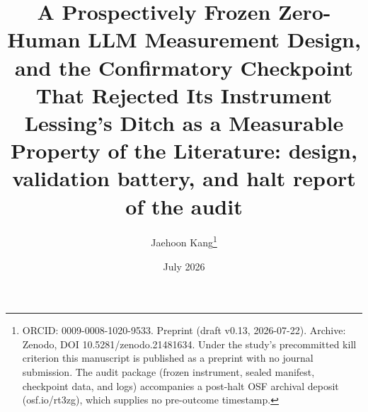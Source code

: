 \documentclass[11pt]{article}
\title{\Large\bfseries A Prospectively Frozen Zero-Human LLM Measurement Design, and the Confirmatory Checkpoint That Rejected Its Instrument\\[8pt]
\large\mdseries Lessing's Ditch as a Measurable Property of the Literature: design, validation battery, and halt report of the audit}
\author{Jaehoon Kang\thanks{ORCID: 0009-0008-1020-9533. Preprint (draft v0.13, 2026-07-22). Archive: Zenodo, DOI 10.5281/zenodo.21481634. Under the study's precommitted kill
criterion this manuscript is published as a preprint with no journal submission. The audit
package (frozen instrument, sealed manifest, checkpoint data, and logs) accompanies a
post-halt OSF archival deposit (osf.io/rt3zg), which supplies no pre-outcome timestamp.}}
\date{July 2026}
\begin{document}
\maketitle
\begin{abstract}
\noindent
\end{abstract}
\vspace{0.5em}
\noindent
\vspace{1em}

\clearpage

\end{document}
